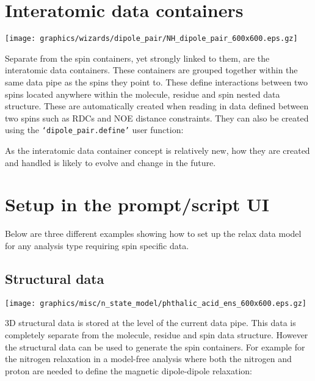 \section{Interatomic data containers} \label{sect: interatomic container}

\begin{figure*}[h]
\texttt{[image: graphics/wizards/dipole\_pair/NH\_dipole\_pair\_600x600.eps.gz]}
\end{figure*}

Separate from the spin containers, yet strongly linked to them, are the interatomic data containers.  These containers are grouped together within the same data pipe as the spins they point to.  These define interactions between two spins located anywhere within the molecule, residue and spin nested data structure.  These are automatically created when reading in data defined between two spins such as RDCs and NOE distance constraints.  They can also be created using the \texttt{`dipole\_pair.define'} user function:


As the interatomic data container concept is relatively new, how they are created and handled is likely to evolve and change in the future.




\section{Setup in the prompt/script UI}

Below are three different examples showing how to set up the relax data model for any analysis type requiring spin specific data.



\subsection{Structural data} \label{sect: script - structural data}

\begin{figure*}[h]
\texttt{[image: graphics/misc/n\_state\_model/phthalic\_acid\_ens\_600x600.eps.gz]}
\end{figure*}

3D structural data is stored at the level of the current data pipe.  This data is completely separate from the molecule, residue and spin data structure.  However the structural data can be used to generate the spin containers.  For example for the nitrogen relaxation in a model-free analysis where both the nitrogen and proton are needed to define the magnetic dipole-dipole relaxation:

